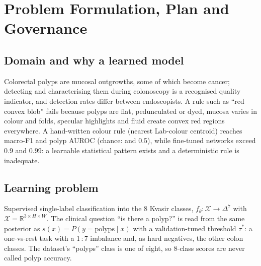 \chapter{Problem Formulation, Plan and Governance}
\section{Domain and why a learned model}
Colorectal polyps are mucosal outgrowths, some of which become cancer; detecting and characterising them during colonoscopy is a recognised quality indicator, and detection
rates differ between endoscopists. A rule such as ``red convex blob'' fails because polyps are flat, pedunculated or dyed, mucosa varies in colour and
folds, specular highlights and fluid create convex red regions everywhere. A hand-written colour rule (nearest Lab-colour centroid) reaches macro-F1 \heurF{} and polyp AUROC \heurAU{}
(chance: \randF{} and 0.5), while fine-tuned networks exceed 0.9 and 0.99: a learnable statistical pattern exists and a deterministic rule is inadequate.

\section{Learning problem}
Supervised single-label classification into the 8 Kvasir classes, $f_\theta:\mathcal{X}\to\Delta^7$ with $\mathcal{X}=\mathbb{R}^{3\times H\times W}$.
The clinical question ``is there a polyp?'' is read from the same posterior as $s(x)=P(y=\text{polyps}\mid x)$ with a validation-tuned threshold $\tau^\ast$:
a one-vs-rest task with a 1\,:\,7 imbalance and, as hard negatives, the other colon classes. The dataset's ``polyps'' class is one of eight, so 8-class scores are never called polyp accuracy.

